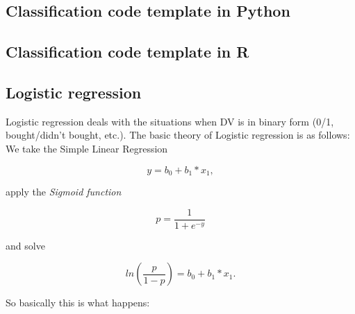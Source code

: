 \documentclass[runningheads,a4paper]{llncs}
\begin{document}
\subsection{Classification code template in Python}
\lstset{basicstyle=\tiny}



\subsection{Classification code template in R}




\subsection{Logistic regression}


Logistic regression deals with the situations when DV is in binary form (0/1, bought/didn't bought, etc.). The basic theory of Logistic regression is as follows: We take the Simple Linear Regression

\begin{equation}
y = b_0 + b_1*x_1,
\end{equation}

apply the \textit{Sigmoid function}

\begin{equation}
p = \frac{1}{1+e^{-y}}
\end{equation}

and solve 

\begin{equation}
ln(\frac{p}{1-p}) = b_0 + b_1*x_1.
\end{equation}

So basically this is what happens:
\end{document}
